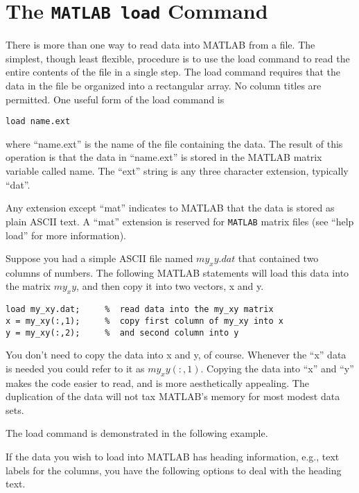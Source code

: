 \documentclass[12pt]{article}
\begin{document}

\tableofcontents

\section{The \texttt{MATLAB load} Command}

There is more than one way to read data into MATLAB from a file. The simplest, though least flexible, procedure is to use the load command to read the entire contents of the file in a single step. The load command requires that the data in the file be organized into a rectangular array. No column titles are permitted. One useful form of the load command is

\texttt{load name.ext}

where ``name.ext'' is the name of the file containing the data. The result of this operation is that the data in ``name.ext'' is stored in the MATLAB matrix variable called name. The ``ext'' string is any three character extension, typically ``dat''.

Any extension except ``mat'' indicates to MATLAB that the data is stored as plain ASCII text. A ``mat'' extension is reserved for \texttt{MATLAB} matrix files (see ``help load'' for more information).

Suppose you had a simple ASCII file named $my_xy.dat$ that contained two columns of numbers. The following MATLAB statements will load this data into the matrix $my_xy$, and then copy it into two vectors, x and y.
\begin{verbatim}
load my_xy.dat;     %  read data into the my_xy matrix
x = my_xy(:,1);     %  copy first column of my_xy into x
y = my_xy(:,2);     %  and second column into y
\end{verbatim}
You don't need to copy the data into x and y, of course. Whenever the ``x'' data is needed you could refer to it as $my_xy(:,1)$. Copying the data into ``x'' and ``y'' makes the code easier to read, and is more aesthetically appealing. The duplication of the data will not tax MATLAB's memory for most modest data sets.

The load command is demonstrated in the following example.

If the data you wish to load into MATLAB has heading information, e.g., text labels for the columns, you have the following options to deal with the heading text.
\end{document}
